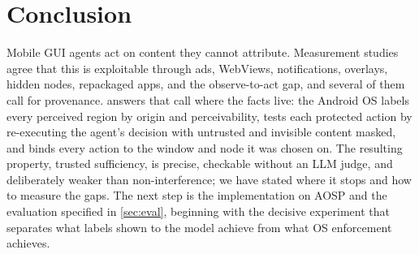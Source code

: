 \section{Conclusion}\label{sec:conclusion}

Mobile GUI agents act on content they cannot attribute. Measurement studies agree that this is exploitable through ads, WebViews, notifications, overlays, hidden nodes, repackaged apps, and the observe-to-act gap, and several of them call for provenance. \PG{} answers that call where the facts live: the Android OS labels every perceived region by origin and perceivability, tests each protected action by re-executing the agent's decision with untrusted and invisible content masked, and binds every action to the window and node it was chosen on. The resulting property, trusted sufficiency, is precise, checkable without an LLM judge, and deliberately weaker than non-interference; we have stated where it stops and how to measure the gaps. The next step is the implementation on AOSP and the evaluation specified in \cref{sec:eval}, beginning with the decisive experiment that separates what labels shown to the model achieve from what OS enforcement achieves.
